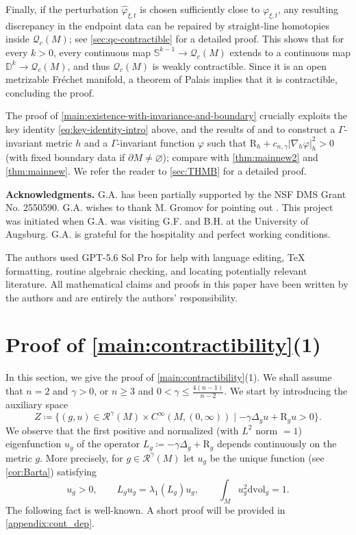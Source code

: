 \documentclass[11pt]{amsart}
\numberwithin{equation}{section}
\newcommand{\Riem}{\mathcal{R}}
\newcommand{\scal}{\mathrm{R}}
\newcommand{\Laplace}{\Delta}
\let\ge\geqslant
\let\leq\leqslant
\begin{document}
Finally, if the perturbation $\widehat\varphi_{\xi,t}$ is chosen sufficiently close to $\varphi_{\xi,t}$, any resulting discrepancy in the endpoint data can be repaired by straight-line homotopies inside $\mathcal Q_c(M)$; see \cref{sec:qc-contractible} for a detailed proof. 
This shows that for every $k> 0$, every continuous map $\mathbb S^{k-1}\to\mathcal Q_c(M)$ extends to a continuous map $\mathbb D^k\to\mathcal{Q}_c(M)$, and thus $\mathcal Q_c(M)$ is weakly contractible. 
Since it is an open metrizable Fréchet manifold, a  theorem of Palais implies that it is contractible, concluding the proof.
\smallskip

The proof of \cref{main:existence-with-invariance-and-boundary} crucially exploits the key identity \eqref{eq:key-identity-intro} above, and the results of \cite{BaerHankeLocalFlexibility} and \cite{BaerHankeBoundaryConditions} to construct a $\Gamma$-invariant metric $h$ and a $\Gamma$-invariant function $\varphi$ such that $\scal_h+c_{n,\gamma}|\nabla_h\varphi|_h^2>0$ (with fixed boundary data if $\partial M\neq\varnothing$); compare with \cref{thm:mainnew2} and \cref{thm:mainnew}. We refer the reader to \cref{sec:THMB} for a detailed proof.
\medskip

\noindent\textbf{Acknowledgments.} G.A. has been partially supported by the NSF DMS Grant No. 2550590. G.A. wishes to thank M. Gromov for pointing out \cite[Conjecture 3, Section 6.1.2]{GromovFourLectures}. This project was initiated when G.A. was visiting G.F. and B.H. at the University of Augsburg.
G.A. is grateful for the hospitality and perfect working conditions. 
\smallskip

The authors used GPT-5.6 Sol Pro for help with language editing, TeX formatting, routine algebraic checking, and locating potentially relevant literature. All mathematical claims and proofs in this paper have been written by the authors and are entirely the authors' responsibility.

\section{Proof of \texorpdfstring{\cref{main:contractibility}}{Theorem A}(1)}\label{sec:A1}

In this section, we give the proof of \cref{main:contractibility}(1).
We shall assume that $n = 2$ and $\gamma>0$, or $n\ge3$ and $0<\gamma\leq \frac{4(n-1)}{n-2}$. We start by introducing the auxiliary space
\[ 
Z\coloneqq \{(g,u)\in\Riem^\gamma(M)\times C^\infty(M,(0,\infty))\mid -\gamma\Delta_gu + \scal_{g} u>0\}.
\]
We observe that the first positive and normalized (with $L^2$ norm $=1$) eigenfunction $u_g$ of the operator $L_g\coloneqq-\gamma\Laplace_g + \scal_g$ depends continuously on the metric $g$.
More precisely, for $g\in\Riem^\gamma(M)$ let $u_g$ be the unique function (see \cref{cor:Barta}) satisfying
\begin{equation}\label{eqn:UniqueNormalized}
  u_g>0, \qquad L_g u_g = \lambda_1(L_g)u_g, \qquad \int_M u_g^2\mathrm{d}\mathrm{vol}_g = 1.
\end{equation}
The following fact is well-known. 
A short proof will be provided in \cref{appendix:cont_dep}.
\end{document}
